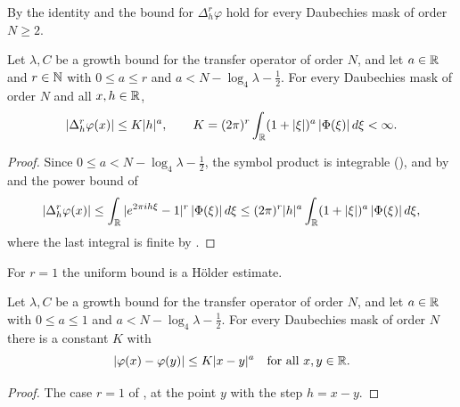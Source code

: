 By  the identity and the bound for $\Delta_h^r \varphi$
hold for every Daubechies mask of order $N \geq 2$.

\begin{proposition}
\label{prop:daub-scaling-difference-uniform}
\leanok
{}
Let $\lambda, C$ be a growth bound for the transfer operator of order $N$, and let $a \in \mathbb{R}$ and
$r \in \mathbb{N}$ with $0 \leq a \leq r$ and $a < N - \log_4 \lambda - \frac12$. For every Daubechies
mask of order $N$ and all $x, h \in \mathbb{R}$,
\[
  |\Delta_h^r \varphi(x)| \leq K |h|^a , \qquad
  K = (2\pi)^r \int_{\mathbb{R}} (1 + |\xi|)^a \, |\Phi(\xi)| \, d\xi < \infty .
\]
\end{proposition}

\begin{proof}
\leanok
{}
Since $0 \leq a < N - \log_4 \lambda - \frac12$, the symbol product is integrable
(), and by 
and the power bound of 
\[
  |\Delta_h^r \varphi(x)| \leq \int_{\mathbb{R}} |e^{2\pi i h \xi} - 1|^r \, |\Phi(\xi)| \, d\xi
  \leq (2\pi)^r |h|^a \int_{\mathbb{R}} (1 + |\xi|)^a \, |\Phi(\xi)| \, d\xi ,
\]
where the last integral is finite by .
\end{proof}

For $r = 1$ the uniform bound is a H\"older estimate.

\begin{theorem}
\label{thm:daub-holder-fourier}
\leanok
{}
Let $\lambda, C$ be a growth bound for the transfer operator of order $N$, and let $a \in \mathbb{R}$ with
$0 \leq a \leq 1$ and $a < N - \log_4 \lambda - \frac12$. For every Daubechies mask of order $N$
there is a constant $K$ with
\[
  |\varphi(x) - \varphi(y)| \leq K |x - y|^a \quad\text{for all } x, y \in \mathbb{R} .
\]
\end{theorem}

\begin{proof}
\leanok
{}
The case $r = 1$ of , at the point $y$ with the step
$h = x - y$.
\end{proof}

